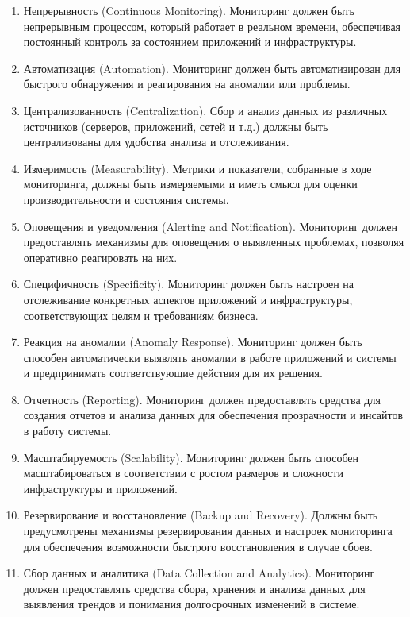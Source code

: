 \documentclass[referat]{SCWorks}
\begin{document}
\begin{enumerate}
  \item Непрерывность (Continuous Monitoring). Мониторинг должен быть непрерывным процессом, который работает в реальном времени, обеспечивая постоянный контроль за состоянием приложений и инфраструктуры.
  
  \item Автоматизация (Automation). Мониторинг должен быть автоматизирован для быстрого обнаружения и реагирования на аномалии или проблемы.
  
  \item Централизованность (Centralization). Сбор и анализ данных из различных источников (серверов, приложений, сетей и т.д.) должны быть централизованы для удобства анализа и отслеживания.
  
  \item Измеримость (Measurability). Метрики и показатели, собранные в ходе мониторинга, должны быть измеряемыми и иметь смысл для оценки производительности и состояния системы.
  
  \item Оповещения и уведомления (Alerting and Notification). Мониторинг должен предоставлять механизмы для оповещения о выявленных проблемах, позволяя оперативно реагировать на них.
  
  \item Специфичность (Specificity). Мониторинг должен быть настроен на отслеживание конкретных аспектов приложений и инфраструктуры, соответствующих целям и требованиям бизнеса.
  
  \item Реакция на аномалии (Anomaly Response). Мониторинг должен быть способен автоматически выявлять аномалии в работе приложений и системы и предпринимать соответствующие действия для их решения.
  
  \item Отчетность (Reporting). Мониторинг должен предоставлять средства для создания отчетов и анализа данных для обеспечения прозрачности и инсайтов в работу системы.
  
  \item Масштабируемость (Scalability). Мониторинг должен быть способен масштабироваться в соответствии с ростом размеров и сложности инфраструктуры и приложений.
  
  \item Резервирование и восстановление (Backup and Recovery). Должны быть предусмотрены механизмы резервирования данных и настроек мониторинга для обеспечения возможности быстрого восстановления в случае сбоев.
  
  \item Сбор данных и аналитика (Data Collection and Analytics). Мониторинг должен предоставлять средства сбора, хранения и анализа данных для выявления трендов и понимания долгосрочных изменений в системе.
\end{enumerate}
\end{document}
